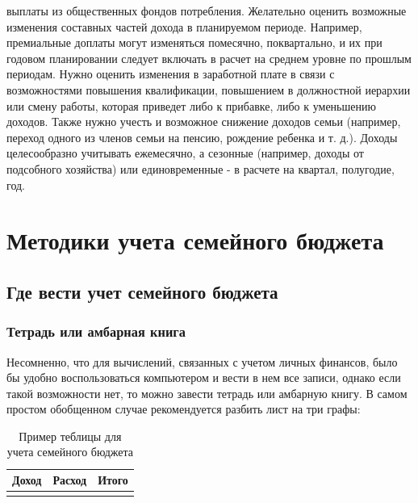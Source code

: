 выплаты из общественных фондов потребления. Желательно оценить возможные изменения составных частей дохода в планируемом периоде. Например, премиальные доплаты могут изменяться помесячно, поквартально, и их
при годовом планировании следует включать в расчет на среднем уровне по
прошлым периодам. Нужно оценить изменения в заработной плате в связи с возможностями повышения квалификации, повышением в должностной
иерархии или смену работы, которая приведет либо к прибавке, либо к уменьшению доходов. Также нужно учесть и возможное снижение доходов семьи
(например, переход одного из членов семьи на пенсию, рождение ребенка и
т. д.).
Доходы целесообразно учитывать ежемесячно, а сезонные (например, доходы от подсобного хозяйства) или единовременные - в расчете на квартал,
полугодие, год.

\section{Методики учета семейного бюджета}

\subsection{Где вести учет семейного бюджета}

\subsubsection{Тетрадь или амбарная книга}
Несомненно, что для вычислений, связанных с учетом личных финансов,
было бы удобно воспользоваться компьютером и вести в нем все записи, однако если такой возможности нет, то можно завести тетрадь или амбарную
книгу. В самом простом обобщенном случае рекомендуется разбить лист на
три графы:
\begin{table}[H]
	\caption{Пример теблицы для учета семейного бюджета}
	\label{tab:t1}
	\begin{center}
		\begin{tabular}{|r|p{5.5cm}|p{2.5cm}|}
			\hline 
			Доход & Расход & Итого \\ 
			\hline 
			&  &  \\ 
			\hline 
		\end{tabular} 
	\end{center}
\end{table}

